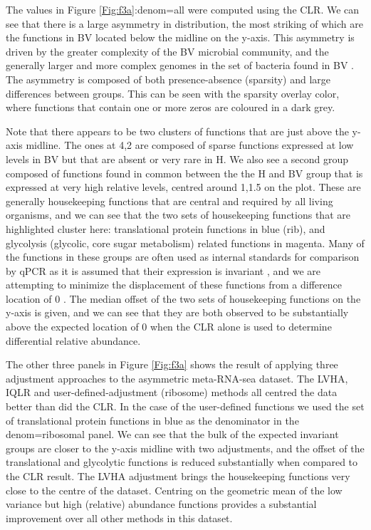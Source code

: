 \documentclass[graybox]{svmult}
\begin{document}
  
The values in Figure \ref{Fig:f3a}:denom=all were computed using the CLR. We can see that there is a large asymmetry in distribution, the most striking of which are the functions in BV located below the midline on the y-axis. This asymmetry is driven by the greater complexity of the BV microbial community, and the generally larger and more complex genomes in the set of bacteria found in BV \cite{macklaim:2013}. The asymmetry is composed of both presence-absence (sparsity) and large differences between groups. This can be seen with the sparsity overlay color, where functions that contain one or more zeros are coloured in a dark grey. 

Note that there appears to be two clusters of functions that are just above the y-axis midline. The ones at 4,2 are composed of sparse functions expressed at low levels in BV but that are absent or very rare in H.  We also see a second group composed of functions found in common between the the H and BV group that is  expressed at very high relative levels, centred around 1,1.5 on the  plot. These are generally housekeeping functions that are central and required by all living organisms, and we can see that the two sets of housekeeping functions that are  highlighted cluster here: translational protein functions in blue (rib), and glycolysis (glycolic, core sugar metabolism) related functions in magenta. Many of the functions in these groups are often used as internal standards for comparison by qPCR as it is assumed that their expression is invariant \cite{Scott:2010}, and we are attempting to minimize the displacement of these functions from a difference location of 0 . The median offset of the two sets of housekeeping functions  on the y-axis is given, and we can see that they are both observed to be substantially above the expected location of 0 when the CLR alone is used to determine differential relative abundance.   

The other three panels in Figure \ref{Fig:f3a} shows the result of applying  three adjustment approaches to the asymmetric meta-RNA-sea dataset. The LVHA, IQLR and user-defined-adjustment (ribosome) methods all centred the data  better than did the CLR. In the case of the user-defined functions we used the set of translational protein functions in blue as the denominator in the denom=ribosomal panel. We can see that the bulk of the expected invariant groups are closer to the y-axis midline with two adjustments, and the offset of the translational and glycolytic functions is reduced substantially when compared to the CLR result. The LVHA adjustment brings the housekeeping functions very close to the centre of the dataset.  Centring on the geometric mean of the low variance but high (relative) abundance functions provides a substantial improvement over all other methods in this dataset.
\end{document}
